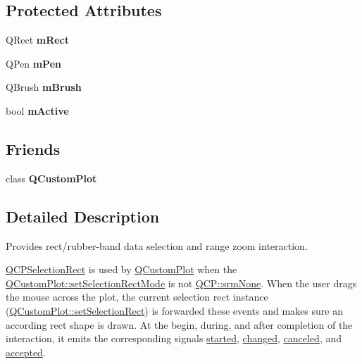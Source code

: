 \subsection*{Protected Attributes}
\begin{DoxyCompactItemize}
\item 
Q\+Rect {\bfseries m\+Rect}\hypertarget{classQCPSelectionRect_a45a2600ef19c8f7b5ec6134beab036cf}{}\label{classQCPSelectionRect_a45a2600ef19c8f7b5ec6134beab036cf}

\item 
Q\+Pen {\bfseries m\+Pen}\hypertarget{classQCPSelectionRect_ae255dec12cd531071115bd667f0fd815}{}\label{classQCPSelectionRect_ae255dec12cd531071115bd667f0fd815}

\item 
Q\+Brush {\bfseries m\+Brush}\hypertarget{classQCPSelectionRect_a1bda3f02c2e4da58c856d19695028cbe}{}\label{classQCPSelectionRect_a1bda3f02c2e4da58c856d19695028cbe}

\item 
bool {\bfseries m\+Active}\hypertarget{classQCPSelectionRect_a1c167356b0bc59e62691bff8c90f5851}{}\label{classQCPSelectionRect_a1c167356b0bc59e62691bff8c90f5851}

\end{DoxyCompactItemize}
\subsection*{Friends}
\begin{DoxyCompactItemize}
\item 
class {\bfseries Q\+Custom\+Plot}\hypertarget{classQCPSelectionRect_a1cdf9df76adcfae45261690aa0ca2198}{}\label{classQCPSelectionRect_a1cdf9df76adcfae45261690aa0ca2198}

\end{DoxyCompactItemize}


\subsection{Detailed Description}
Provides rect/rubber-\/band data selection and range zoom interaction. 

\hyperlink{classQCPSelectionRect}{Q\+C\+P\+Selection\+Rect} is used by \hyperlink{classQCustomPlot}{Q\+Custom\+Plot} when the \hyperlink{classQCustomPlot_a810ef958ebe84db661c7288b526c0deb}{Q\+Custom\+Plot\+::set\+Selection\+Rect\+Mode} is not \hyperlink{namespaceQCP_ac9aa4d6d81ac76b094f9af9ad2d3aacfa9032f170490d67240a6c68c2638ffab1}{Q\+C\+P\+::srm\+None}. When the user drags the mouse across the plot, the current selection rect instance (\hyperlink{classQCustomPlot_a0c09f96df15faa4799ad7051bb16cf33}{Q\+Custom\+Plot\+::set\+Selection\+Rect}) is forwarded these events and makes sure an according rect shape is drawn. At the begin, during, and after completion of the interaction, it emits the corresponding signals \hyperlink{classQCPSelectionRect_a7b7162d19f4f2174d3644ff1a5d335aa}{started}, \hyperlink{classQCPSelectionRect_a1bab11026bca52740c2e6682623e6964}{changed}, \hyperlink{classQCPSelectionRect_aeb82009393c90130102dccf36477b906}{canceled}, and \hyperlink{classQCPSelectionRect_a15a43542e1f7b953a44c260b419e6d2c}{accepted}.

